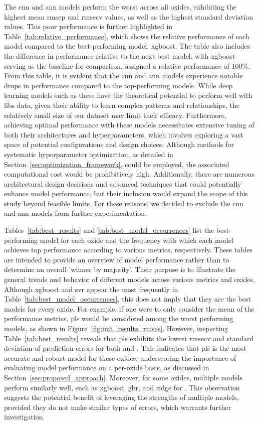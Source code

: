 The \gls{cnn} and \gls{ann} models perform the worst across all oxides, exhibiting the highest mean \gls{rmsep} and \gls{rmsecv} values, as well as the highest standard deviation values.
This poor performance is further highlighted in Table~\ref{tab:relative_performance}, which shows the relative performance of each model compared to the best-performing model, \gls{xgboost}.
The table also includes the difference in performance relative to the next best model, with \gls{xgboost} serving as the baseline for comparison, assigned a relative performance of 100\%.
From this table, it is evident that the \gls{cnn} and \gls{ann} models experience notable drops in performance compared to the top-performing models.
While deep learning models such as these have the theoretical potential to perform well with \gls{libs} data, given their ability to learn complex patterns and relationships, the relatively small size of our dataset may limit their efficacy.
Furthermore, achieving optimal performance with these models necessitates extensive tuning of both their architectures and hyperparameters, which involves exploring a vast space of potential configurations and design choices.
Although methods for systematic hyperparameter optimization, as detailed in Section~\ref{sec:optimization_framework}, could be employed, the associated computational cost would be prohibitively high.
Additionally, there are numerous architectural design decisions and advanced techniques that could potentially enhance model performance, but their inclusion would expand the scope of this study beyond feasible limits.
For these reasons, we decided to exclude the \gls{cnn} and \gls{ann} models from further experimentation.

Tables~\ref{tab:best_results} and \ref{tab:best_model_occurrences} list the best-performing model for each oxide and the frequency with which each model achieves top performance according to various metrics, respectively.
These tables are intended to provide an overview of model performance rather than to determine an overall 'winner by majority'.
Their purpose is to illustrate the general trends and behavior of different models across various metrics and oxides.
Although \gls{xgboost} and \gls{svr} appear the most frequently in Table~\ref{tab:best_model_occurrences}, this does not imply that they are the best models for every oxide.
For example, if one were to only consider the mean of the performance metrics, \gls{pls} would be considered among the worst performing models, as shown in Figure~\ref{fig:init_results_rmses}.
However, inspecting Table~\ref{tab:best_results} reveals that \gls{pls} exhibits the lowest \gls{rmsecv} and standard deviation of prediction errors for both  and .
This indicates that \gls{pls} is the most accurate and robust model for these oxides, underscoring the importance of evaluating model performance on a per-oxide basis, as discussed in Section~\ref{sec:proposed_approach}.
Moreover, for some oxides, multiple models perform similarly well, such as \gls{xgboost}, \gls{gbr}, and ridge for .
This observation suggests the potential benefit of leveraging the strengths of multiple models, provided they do not make similar types of errors, which warrants further investigation.

